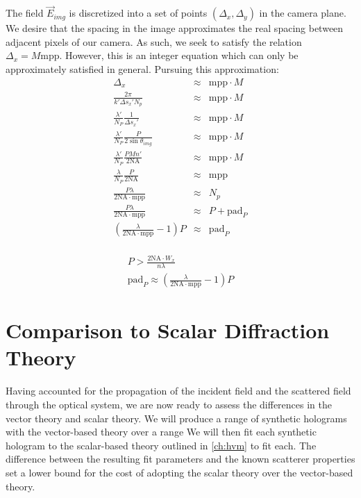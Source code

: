   The field $\vec{E}_{img}$ is discretized into a set of points 
  $\left ( \Delta_x, \Delta_y \right )$ in the camera plane. We desire that the
  spacing in the image approximates the real spacing between adjacent 
  pixels of our camera. As such, we seek to satisfy the relation 
  $\Delta_x = M\text{mpp}$. However, this is an integer equation which can only
  be approximately satisfied in general. Pursuing this approximation:
  \begin{eqnarray*}
    \Delta_x &\approx& \text{mpp}\cdot M \\
    \frac{2 \pi}{k' \Delta s_x' N_p} &\approx& \text{mpp}\cdot M \\
    \frac{\lambda'}{N_P} \frac{1}{\Delta s_x'} &\approx& \text{mpp}\cdot M \\
    \frac{\lambda'}{N_P} \frac{P}{2 \sin{\theta_{img}}} &\approx& \text{mpp}\cdot M \\
    \frac{\lambda'}{N_P} \frac{PMn'}{2\text{NA}} &\approx& \text{mpp}\cdot M \\
    \frac{\lambda}{N_P} \frac{P}{2\text{NA}} &\approx& \text{mpp} \\
    \frac{P\lambda}{2\text{NA}\cdot\text{mpp}} &\approx& N_p \\
    \frac{P\lambda}{2\text{NA}\cdot\text{mpp}} &\approx& P+\text{pad}_P \\
    \left ( \frac{\lambda}{2\text{NA}\cdot\text{mpp}} - 1 \right )P &\approx& \text{pad}_P \\    
  \end{eqnarray*}

  \begin{equation}
    \begin{split}
      P > \frac{2 \text{NA}\cdot W_x}{n\lambda} \\
      \text{pad}_P  \approx  \left ( \frac{\lambda}{2\text{NA}\cdot\text{mpp}} - 1 \right )P
    \end{split}
  \end{equation}


  
\section{Comparison to Scalar Diffraction Theory}

Having accounted for the propagation of the incident field and the scattered
field through the optical system, we are now ready to assess the differences
in the vector theory and scalar theory. We will produce a range of synthetic
holograms with the vector-based theory over a range %
We will then fit each synthetic
hologram to the scalar-based theory outlined in \autoref{ch:hvm} to fit each.
The difference between the resulting fit parameters and the known scatterer
properties set a lower bound for the cost of adopting the scalar theory
over the vector-based theory.

